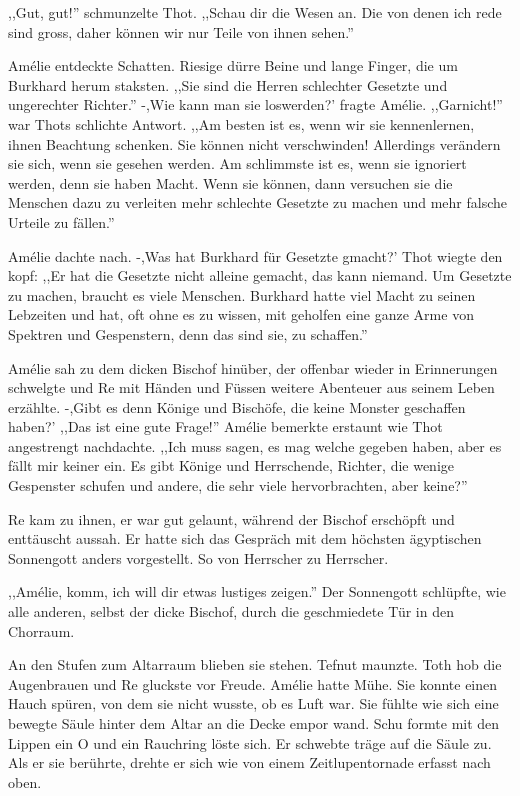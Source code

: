 \documentclass[11pt,titlepage,a5paper]{book}
\begin{document}
,,Gut, gut!'' schmunzelte Thot. ,,Schau dir die Wesen an. Die von denen ich rede sind gross, daher können wir nur Teile von ihnen sehen.''

Amélie entdeckte Schatten. Riesige dürre Beine und lange Finger, die um Burkhard herum staksten. ,,Sie sind die Herren schlechter Gesetzte und ungerechter Richter.'' -,Wie kann man sie loswerden?' fragte Amélie. ,,Garnicht!'' war Thots schlichte Antwort. ,,Am besten ist es, wenn wir sie kennenlernen, ihnen Beachtung schenken. Sie können nicht verschwinden! Allerdings verändern sie sich, wenn sie gesehen werden. Am schlimmste ist es, wenn sie ignoriert werden, denn sie haben Macht. Wenn sie können, dann versuchen sie die Menschen dazu zu verleiten mehr schlechte Gesetzte zu machen und mehr falsche Urteile zu fällen.''

Amélie dachte nach. -,Was hat Burkhard für Gesetzte gmacht?' Thot wiegte den kopf: ,,Er hat die Gesetzte nicht alleine gemacht, das kann niemand. Um Gesetzte zu machen, braucht es viele Menschen. Burkhard hatte viel Macht zu seinen Lebzeiten und hat, oft ohne es zu wissen, mit geholfen eine ganze Arme von Spektren und Gespenstern, denn das sind sie, zu schaffen.''

Amélie sah zu dem dicken Bischof hinüber, der offenbar wieder in Erinnerungen schwelgte und Re mit Händen und Füssen weitere Abenteuer aus seinem Leben erzählte. -,Gibt es denn Könige und Bischöfe, die keine Monster geschaffen haben?' ,,Das ist eine gute Frage!'' Amélie bemerkte erstaunt wie Thot angestrengt nachdachte. ,,Ich muss sagen, es mag welche gegeben haben, aber es fällt mir keiner ein. Es gibt Könige und Herrschende, Richter, die wenige Gespenster schufen und andere, die sehr viele hervorbrachten, aber keine?''

Re kam zu ihnen, er war gut gelaunt, während der Bischof erschöpft und enttäuscht aussah. Er hatte sich das Gespräch mit dem höchsten ägyptischen Sonnengott anders vorgestellt. So von Herrscher zu Herrscher. 

,,Amélie, komm, ich will dir etwas lustiges zeigen.'' Der Sonnengott schlüpfte, wie alle anderen, selbst der dicke Bischof, durch die geschmiedete Tür in den Chorraum.

An den Stufen zum Altarraum blieben sie stehen. Tefnut maunzte. Toth hob die Augenbrauen und Re gluckste vor Freude. Amélie hatte Mühe. Sie konnte einen Hauch spüren, von dem sie nicht wusste, ob es Luft war. Sie fühlte wie sich eine bewegte Säule hinter dem Altar an die Decke empor wand. Schu formte mit den Lippen ein O und ein Rauchring löste sich. Er schwebte träge auf die Säule zu. Als er sie berührte, drehte er sich wie von einem Zeitlupentornade erfasst nach oben. 
\end{document}
